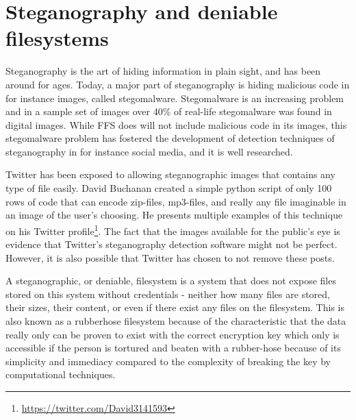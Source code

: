 \section{Steganography and deniable filesystems}
Steganography is the art of hiding information in plain sight, and has been around for ages. Today, a major part of steganography is hiding malicious code in for instance images, called stegomalware. Stegomalware is an increasing problem and in a sample set of images over 40\% of real-life stegomalware was found in digital images\cite{SIMARGLStegwarePrimer}. While FFS does will not include malicious code in its images, this stegomalware problem has fostered the development of detection techniques of steganography in for instance social media, and it is well researched. 

Twitter has been exposed to allowing steganographic images that contains any type of file easily\cite{TwitterImagesCan}. David Buchanan created a simple python script of only 100 rows of code that can encode zip-files, mp3-files, and really any file imaginable in an image of the user's choosing\cite{buchananTweetablepolyglotpng2022}. He presents multiple examples of this technique on his Twitter profile\footnote{\url{https://twitter.com/David3141593}}. The fact that the images available for the public's eye is evidence that Twitter's steganography detection software might not be perfect. However, it is also possible that Twitter has chosen to not remove these posts.

A steganographic, or deniable, filesystem is a system that does not expose files stored on this system without credentials - neither how many files are stored, their sizes, their content, or even if there exist any files on the filesystem\cite{petersDEFYDeniableFile2014}. This is also known as a rubberhose filesystem because of the characteristic that the data really only can be proven to exist with the correct encryption key which only is accessible if the person is tortured and beaten with a rubber-hose because of its simplicity and immediacy compared to the complexity of breaking the key by computational techniques.

